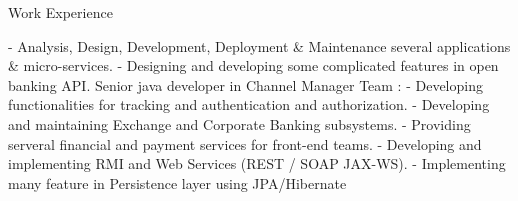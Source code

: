\begin{jrsection}{Work Experience}
{\begin{jrdescription}
{            - Analysis, Design, Development, Deployment \& Maintenance several applications \& micro-services.\linebreak
            - Designing and developing some complicated features in open banking API.\linebreak
        Senior java developer in Channel Manager Team :\linebreak
            - Developing functionalities for tracking and authentication and authorization.\linebreak
            - Developing and maintaining Exchange and Corporate Banking subsystems.
            - Providing serveral financial and payment services for front-end teams.\linebreak
            - Developing and implementing RMI and Web Services (REST / SOAP JAX-WS).\linebreak
            - Implementing many feature in Persistence layer using JPA/Hibernate \linebreak
        }
        \end{jrdescription}
    }
\end{jrsection}
